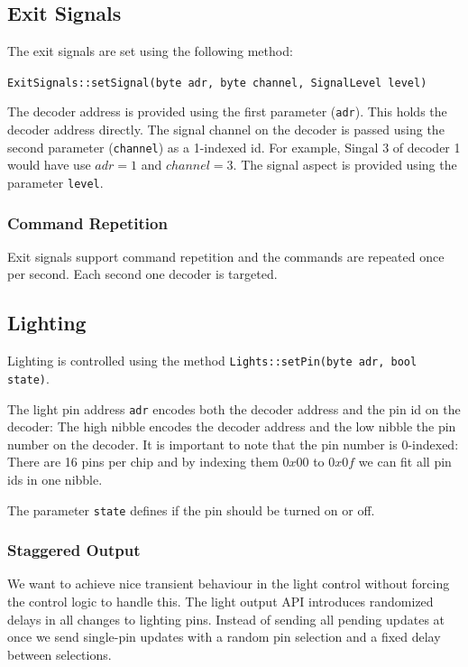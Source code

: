 \documentclass{scrreprt}
\newcommand{\code}[1]{\texttt{#1}}
\begin{document}
\subsection{Exit Signals}
The exit signals are set using the following method:

\code{ExitSignals::setSignal(byte adr, byte channel, SignalLevel level)}

The decoder address is provided using the first parameter (\code{adr}).
This holds the decoder address directly. 
The signal channel on the decoder is passed using the second parameter (\code{channel}) as a 1-indexed id.
For example, Singal 3 of decoder 1 would have use $adr=1$ and $channel=3$.
The signal aspect is provided using the parameter \code{level}.

\subsubsection{Command Repetition}
Exit signals support command repetition and the commands are repeated once per second.
Each second one decoder is targeted.

\subsection{Lighting}
Lighting is controlled using the method \code{Lights::setPin(byte adr, bool state)}.

The light pin address \code{adr} encodes both the decoder address and the pin id on the decoder:
The high nibble encodes the decoder address and the low nibble the pin number on the decoder.
It is important to note that the pin number is 0-indexed:
There are 16 pins per chip and by indexing them $0x00$ to $0x0f$ we can fit all pin ids in one nibble.

The parameter \code{state} defines if the pin should be turned on or off.

\subsubsection{Staggered Output}
We want to achieve nice transient behaviour in the light control without forcing the control logic to handle this.
The light output API introduces randomized delays in all changes to lighting pins.
Instead of sending all pending updates at once we send single-pin updates with a random pin selection and a fixed delay between selections.
\end{document}
